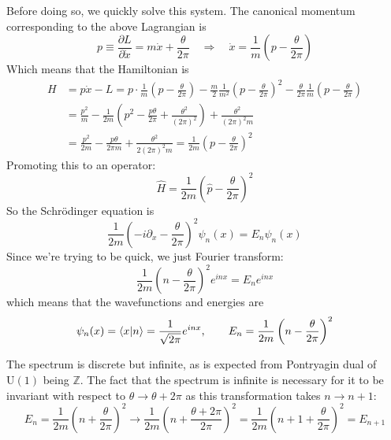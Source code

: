 \documentclass{report}
\begin{document}
Before doing so, we quickly solve this system. The canonical momentum 
corresponding to the above Lagrangian is 
\begin{equation*}
	p \equiv \frac{\partial L}{\partial \dot{x}}
		= m\dot{x} + \frac{\theta}{2\pi}
		\quad \Longrightarrow \quad 
		\dot{x} = \frac{1}{m}\left(p - \frac{\theta}{2\pi}\right)
\end{equation*}
Which means that the Hamiltonian is 
\begin{align*}
	H &= p\dot{x} - L
		= p\cdot \frac{1}{m}\left(p - \frac{\theta}{2\pi}\right)
			- \frac{m}{2}\frac{1}{m^2} \left(p - \frac{\theta}{2\pi}\right)^2 
			- \frac{\theta}{2\pi} \frac{1}{m}\left(p - \frac{\theta}{2\pi}\right)\\
		&= \frac{p^2}{m} - \frac{1}{2m}\left(p^2 - \frac{p\theta}{2\pi} + \frac{\theta^2}{(2\pi)^2}\right)
			+ \frac{\theta^2}{(2\pi)^2 m}\\ 
		&= \frac{p^2}{2m} - \frac{p\theta}{2\pi m} + \frac{\theta^2}{2(2\pi)^2 m}
		= \frac{1}{2m}\left(p - \frac{\theta}{2\pi}\right)^2
\end{align*}
Promoting this to an operator: 
\begin{equation*}
	\hat{H} = \frac{1}{2m}\left(\hat{p} - \frac{\theta}{2\pi}\right)^2
\end{equation*}
So the Schr\"odinger equation is 
\begin{equation*}
	\frac{1}{2m}\left(- i\partial_x - \frac{\theta}{2\pi}\right)^2 \psi_n(x) 
		= E_n\psi_n(x)
\end{equation*}
Since we're trying to be quick, we just Fourier transform: 
\begin{equation*}
	\frac{1}{2m}\left(n - \frac{\theta}{2\pi}\right)^2 
		e^{inx} = E_n e^{inx}
\end{equation*}
which means that the wavefunctions and energies are 
\begin{equation}\label{eq:particle-on-ring-eigenstates}
	\psi_n(x) = \braket{x}{n} = \frac{1}{\sqrt{2\pi}}e^{inx},\qquad 
		E_n = \frac{1}{2m}\left(n- \frac{\theta}{2\pi}\right)^2
\end{equation}

The spectrum is discrete but infinite, as is expected from Pontryagin dual 
of $ \text{U}(1) $ being $ \mathbb{Z} $. The fact that the spectrum is infinite is necessary 
for it to be invariant with respect to $ \theta \rightarrow \theta + 2\pi $ as this 
transformation takes $n \rightarrow n+1 $: 
\begin{equation*}
	E_n = \frac{1}{2m}\left(n + \frac{\theta}{2\pi}\right)^2 
		\rightarrow 
		\frac{1}{2m}\left(n + \frac{\theta + 2\pi}{2\pi}\right)^2 
		= \frac{1}{2m}\left(n + 1 + \frac{\theta}{2\pi}\right)^2 = E_{n+1}
\end{equation*}
\end{document}
